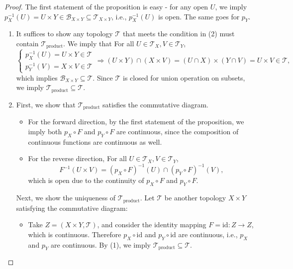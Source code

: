 \begin{proof} The first statement of the proposition is easy - for any open \(U\), we imply \(p_X^{-1}\left(U\right)  = U \times  Y \in  {\mathcal{B}}_{X \times  Y} \subseteq  {\mathcal{T}}_{X \times  Y}\), i.e., \(p_X^{-1}\left(U\right)\) is open. The same goes for \(p_Y\).

\begin{enumerate}
    \item  It suffices to show any topology \(\mathcal{T}\) that meets the condition in (2) must contain \({\mathcal{T}}_{\text{product}}\). We imply that For all \(U \in  {\mathcal{T}}_X,V \in  {\mathcal{T}}_Y\),
\[
\left\{  {\begin{array}{l} p_X^{-1}\left(U\right)  = U \times  Y \in  \mathcal{T} \\  p_Y^{-1}\left(V\right)  = X \times  V \in  \mathcal{T} \end{array} \Rightarrow  \left({U \times  Y}\right)  \cap  \left({X \times  V}\right)  = \left({U \cap  X}\right)  \times  \left({Y \cap  V}\right)  = U \times  V \in  \mathcal{T},}\right.
\]
which implies \({\mathcal{B}}_{X \times  Y} \subseteq  \mathcal{T}\). Since \(\mathcal{T}\) is closed for union operation on subsets, we
imply \({\mathcal{T}}_{\text{product}} \subseteq  \mathcal{T}\).

\item First, we show that \({\mathcal{T}}_{\text{product}}\) satisfies the commutative diagram.
\begin{itemize}
\item For the forward direction, by the first statement of the proposition, we imply both \(p_X \circ  F\) and \(p_Y \circ  F\) are continuous, since the composition of continuous functions are continuous as well.

\item For the reverse direction, For all \(U \in  {\mathcal{T}}_X,V \in  {\mathcal{T}}_Y\),
\[
{F}^{-1}\left({U \times  V}\right)  = {\left(p_X \circ  F\right)}^{-1}\left(U\right)  \cap  {\left(p_Y \circ  F\right)}^{-1}\left(V\right),
\]
which is open due to the continuity of \(p_X \circ  F\) and \(p_Y \circ  F\).
\end{itemize}

Next, we show the uniqueness of \({\mathcal{T}}_{\text{product}}\). Let \(\mathcal{T}\) be another topology \(X \times  Y\) satisfying the commutative diagram:
\begin{itemize}
\item Take \(Z = \left({X \times  Y,\mathcal{T}}\right)\), and consider the identity mapping \(F = \mathrm{{id}} : Z \rightarrow  Z\), which is continuous. Therefore \(p_X \circ  \mathrm{{id}}\) and \(p_Y \circ  \mathrm{{id}}\) are continuous, i.e., \(p_X\) and \(p_Y\) are continuous. By (1), we imply \({\mathcal{T}}_{\text{product}} \subseteq  \mathcal{T}\).


\end{itemize}
\end{enumerate}
\end{proof}

